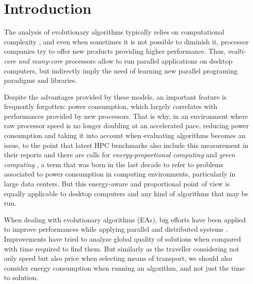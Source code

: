 \section{Introduction}

The analysis of evolutionary algorithms typically relies on computational complexity \cite{complexity}, %
 and even when sometimes it is not possible to diminish it, processor
 companies try to offer new products providing higher performance.
 Thus, \textit{multi-core and many-core} processors allow to run
 parallel applications on desktop computers, but indirectly imply the
 need of learning new parallel programing paradigms and libraries. %

Despite the advantages provided by these models, an important feature
is frequently forgotten:  power consumption, which largely correlates
with performances provided by new processors. That is why, in an
environment where raw processor speed is no longer doubling at an
accelerated pace, reducing power consumption and taking it into
account when evaluating algorithms becomes an issue, to the point that
latest HPC benchmarks also include this measurement in their reports
and there are calls for {\em energy-proportional computing}
\cite{barroso2007case} and 
\textit{green computing} \cite{green-computing}, a term that was born in the last decade to refer
to problems associated to power consumption in computing environments,
particularly in large data centers. But this
energy-aware and proportional point of view is equally applicable to desktop computers
and any kind of algorithms that may be run. 

When dealing with evolutionary algorithms (EAs), big efforts have been
applied to improve performances while applying parallel and
distributed systems \cite{paba}.  Improvements have tried to analyse
global quality of solutions when compared with time required to find
them.   
But similarly as the traveller considering not only speed but also
price when selecting means of transport, we should also consider
energy consumption when running an algorithm, and not just the time to
solution.  %


